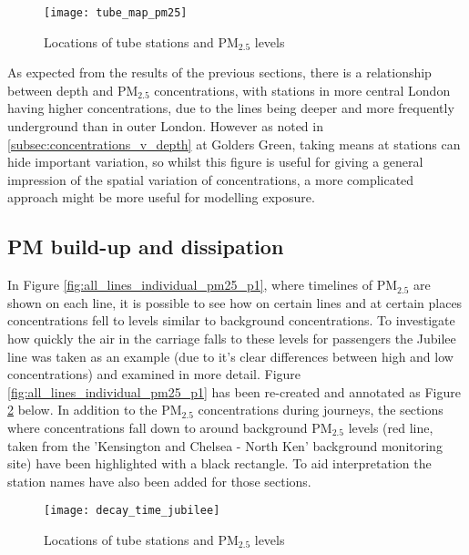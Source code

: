 \begin{figure}[H]
\centering
\texttt{[image: tube\_map\_pm25]}
\caption{Locations of tube stations and PM$_{2.5}$ levels}
\label{fig:tube_map_pm25}
\end{figure}

As expected from the results of the previous sections, there is a relationship between depth and PM$_{2.5}$ concentrations, with stations in more central London having higher concentrations, due to the lines being deeper and more frequently underground than in outer London. However as noted in \autoref{subsec:concentrations_v_depth} at Golders Green, taking means at stations can hide important variation, so whilst this figure is useful for giving a general impression of the spatial variation of concentrations, a more complicated approach might be more useful for modelling exposure.

\subsection{PM build-up and dissipation}
\label{subsec:tube_air_build_up}
In Figure \ref{fig:all_lines_individual_pm25_p1}, where timelines of PM$_{2.5}$ are shown on each line, it is possible to see how on certain lines and at certain places concentrations fell to levels similar to background concentrations. To investigate how quickly the air in the carriage falls to these levels for passengers the Jubilee line was taken as an example (due to it's clear differences between high and low concentrations) and examined in more detail. Figure \ref{fig:all_lines_individual_pm25_p1} has been re-created and annotated as Figure \ref{fig:decay_time_jubilee} below. In addition to the PM$_{2.5}$ concentrations during journeys, the sections where concentrations fall down to around background PM$_{2.5}$ levels (red line, taken from the 'Kensington and Chelsea - North Ken' background monitoring site) have been highlighted with a black rectangle. To aid interpretation the station names have also been added for those sections.

\begin{figure}[H]
\centering
\texttt{[image: decay\_time\_jubilee]}
\caption{Locations of tube stations and PM$_{2.5}$ levels}
\label{fig:decay_time_jubilee}
\end{figure}

